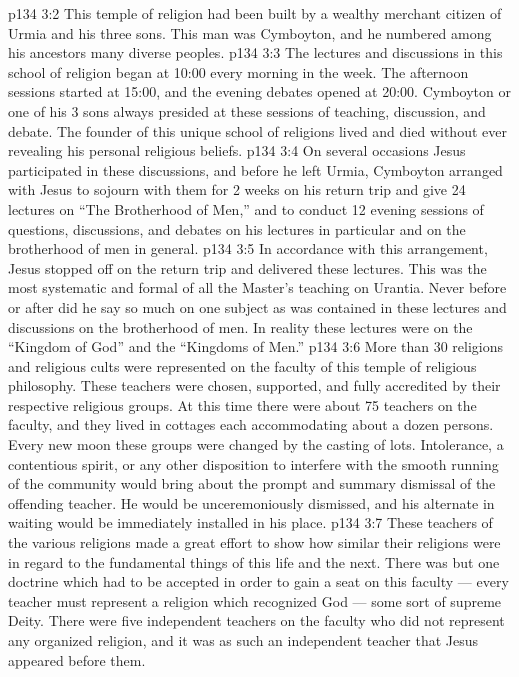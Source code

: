 \vs p134 3:2 This temple of religion had been built by a wealthy merchant citizen of Urmia and his three sons. This man was Cymboyton, and he numbered among his ancestors many diverse peoples.
\vs p134 3:3 The lectures and discussions in this school of religion began at 10:00 every morning in the week. The afternoon sessions started at 15:00, and the evening debates opened at 20:00. Cymboyton or one of his 3 sons always presided at these sessions of teaching, discussion, and debate. The founder of this unique school of religions lived and died without ever revealing his personal religious beliefs.
\vs p134 3:4 On several occasions Jesus participated in these discussions, and before he left Urmia, Cymboyton arranged with Jesus to sojourn with them for 2 weeks on his return trip and give 24 lectures on “The Brotherhood of Men,” and to conduct 12 evening sessions of questions, discussions, and debates on his lectures in particular and on the brotherhood of men in general.
\vs p134 3:5 In accordance with this arrangement, Jesus stopped off on the return trip and delivered these lectures. This was the most systematic and formal of all the Master’s teaching on Urantia. Never before or after did he say so much on one subject as was contained in these lectures and discussions on the brotherhood of men. In reality these lectures were on the “Kingdom of God” and the “Kingdoms of Men.”
\vs p134 3:6 More than 30 religions and religious cults were represented on the faculty of this temple of religious philosophy. These teachers were chosen, supported, and fully accredited by their respective religious groups. At this time there were about 75 teachers on the faculty, and they lived in cottages each accommodating about a dozen persons. Every new moon these groups were changed by the casting of lots. Intolerance, a contentious spirit, or any other disposition to interfere with the smooth running of the community would bring about the prompt and summary dismissal of the offending teacher. He would be unceremoniously dismissed, and his alternate in waiting would be immediately installed in his place.
\vs p134 3:7 These teachers of the various religions made a great effort to show how similar their religions were in regard to the fundamental things of this life and the next. There was but one doctrine which had to be accepted in order to gain a seat on this faculty --- every teacher must represent a religion which recognized God --- some sort of supreme Deity. There were five independent teachers on the faculty who did not represent any organized religion, and it was as such an independent teacher that Jesus appeared before them.

